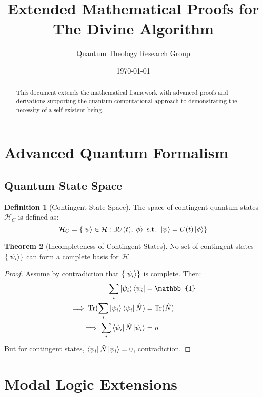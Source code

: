 \documentclass[12pt]{article}
\title{Extended Mathematical Proofs for The Divine Algorithm}
\author{Quantum Theology Research Group}
\date{\today}
\theoremstyle{definition}
\newtheorem{theorem}{Theorem}[section]
\newtheorem{definition}[theorem]{Definition}
\begin{document}
\maketitle

\begin{abstract}
This document extends the mathematical framework with advanced proofs and derivations supporting the quantum computational approach to demonstrating the necessity of a self-existent being.
\end{abstract}

\section{Advanced Quantum Formalism}

\subsection{Quantum State Space}

\begin{definition}[Contingent State Space]
The space of contingent quantum states $\mathcal{H}_C$ is defined as:
\begin{equation}
    \mathcal{H}_C = \{\ket{\psi} \in \mathcal{H} : \exists U(t), \ket{\phi} \text{ s.t. } \ket{\psi} = U(t)\ket{\phi}\}
\end{equation}
\end{definition}

\begin{theorem}[Incompleteness of Contingent States]
No set of contingent states $\{\ket{\psi_i}\}$ can form a complete basis for $\mathcal{H}$.
\end{theorem}

\begin{proof}
Assume by contradiction that $\{\ket{\psi_i}\}$ is complete. Then:
\begin{align}
    \sum_i \ket{\psi_i}\bra{\psi_i} &= \mathbb{1} \\
    \implies \text{Tr}(\sum_i \ket{\psi_i}\bra{\psi_i}\hat{N}) &= \text{Tr}(\hat{N}) \\
    \implies \sum_i \bra{\psi_i}\hat{N}\ket{\psi_i} &= n
\end{align}
But for contingent states, $\bra{\psi_i}\hat{N}\ket{\psi_i} = 0$, contradiction.
\end{proof}

\section{Modal Logic Extensions}
\end{document}
